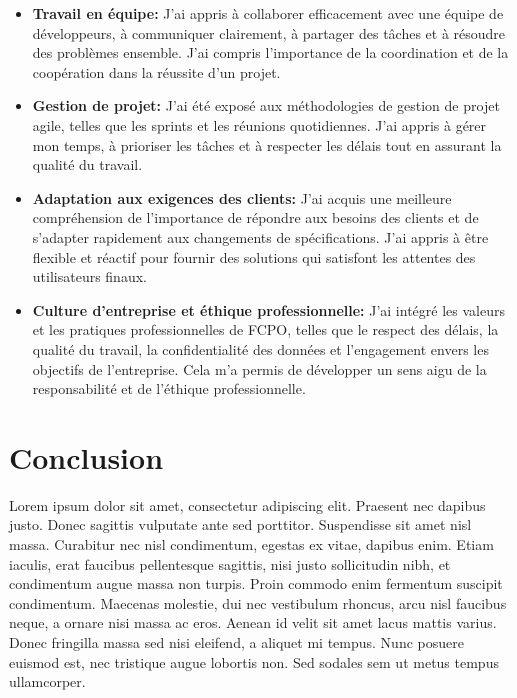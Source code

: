 \begin{itemize}
  \item \textbf{Travail en équipe: }J’ai appris à collaborer efficacement avec une équipe de développeurs, à communiquer clairement, à partager des tâches et à résoudre des problèmes ensemble. J’ai compris l’importance de la coordination et de la coopération dans la réussite d’un projet.
  \item \textbf{Gestion de projet: }J’ai été exposé aux méthodologies de gestion de projet agile, telles que les sprints et les réunions quotidiennes. J’ai appris à gérer mon temps, à prioriser les tâches et à respecter les délais tout en assurant la qualité du travail.
  \item \textbf{Adaptation aux exigences des clients: }J’ai acquis une meilleure compréhension de l’importance de répondre aux besoins des clients et de s’adapter rapidement aux changements de spécifications. J’ai appris à être flexible et réactif pour fournir des solutions qui satisfont les attentes des utilisateurs finaux.
  \item \textbf{Culture d’entreprise et éthique professionnelle: }J’ai intégré les valeurs et les pratiques professionnelles de FCPO, telles que le respect des délais, la qualité du travail, la confidentialité des données et l’engagement envers les objectifs de l’entreprise. Cela m’a permis de développer un sens aigu de la responsabilité et de l’éthique professionnelle.
\end{itemize}


\newpage
\section*{Conclusion}

Lorem ipsum dolor sit amet, consectetur adipiscing elit. Praesent nec dapibus justo. Donec sagittis vulputate ante sed porttitor. Suspendisse sit amet nisl massa. Curabitur nec nisl condimentum, egestas ex vitae, dapibus enim. Etiam iaculis, erat faucibus pellentesque sagittis, nisi justo sollicitudin nibh, et condimentum augue massa non turpis. Proin commodo enim fermentum suscipit condimentum. Maecenas molestie, dui nec vestibulum rhoncus, arcu nisl faucibus neque, a ornare nisi massa ac eros. Aenean id velit sit amet lacus mattis varius. Donec fringilla massa sed nisi eleifend, a aliquet mi tempus. Nunc posuere euismod est, nec tristique augue lobortis non. Sed sodales sem ut metus tempus ullamcorper.
